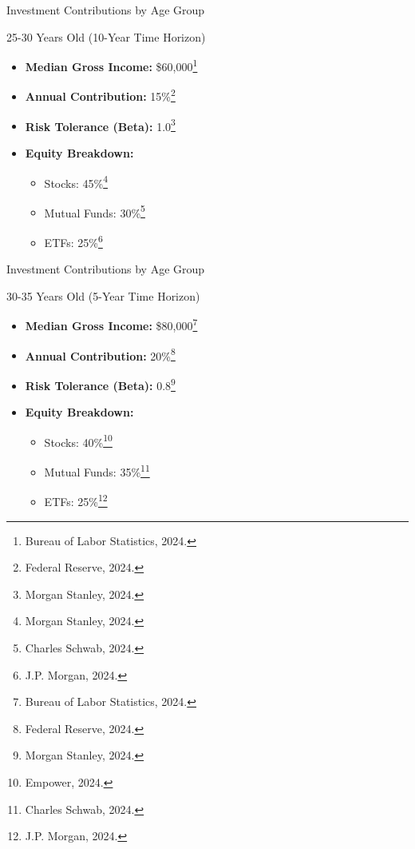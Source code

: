 \documentclass{beamer}
\begin{document}
\begin{frame}{Investment Contributions by Age Group}
    \begin{block}{25-30 Years Old (10-Year Time Horizon)}
        \begin{itemize}
            \item \textbf{Median Gross Income:} \$60,000\footnote{Bureau of Labor Statistics, 2024.}
            \item \textbf{Annual Contribution:} 15\%\footnote{Federal Reserve, 2024.}
            \item \textbf{Risk Tolerance (Beta):} 1.0\footnote{Morgan Stanley, 2024.}
            \item \textbf{Equity Breakdown:}
            \begin{itemize}
                \item Stocks: 45\%\footnote{Morgan Stanley, 2024.}
                \item Mutual Funds: 30\%\footnote{Charles Schwab, 2024.}
                \item ETFs: 25\%\footnote{J.P. Morgan, 2024.}
            \end{itemize}
        \end{itemize}
    \end{block}
\end{frame}

\begin{frame}{Investment Contributions by Age Group}
    \begin{block}{30-35 Years Old (5-Year Time Horizon)}
        \begin{itemize}
            \item \textbf{Median Gross Income:} \$80,000\footnote{Bureau of Labor Statistics, 2024.}
            \item \textbf{Annual Contribution:} 20\%\footnote{Federal Reserve, 2024.}
            \item \textbf{Risk Tolerance (Beta):} 0.8\footnote{Morgan Stanley, 2024.}
            \item \textbf{Equity Breakdown:}
            \begin{itemize}
                \item Stocks: 40\%\footnote{Empower, 2024.}
                \item Mutual Funds: 35\%\footnote{Charles Schwab, 2024.}
                \item ETFs: 25\%\footnote{J.P. Morgan, 2024.}
            \end{itemize}
        \end{itemize}
    \end{block}
\end{frame}
\end{document}
